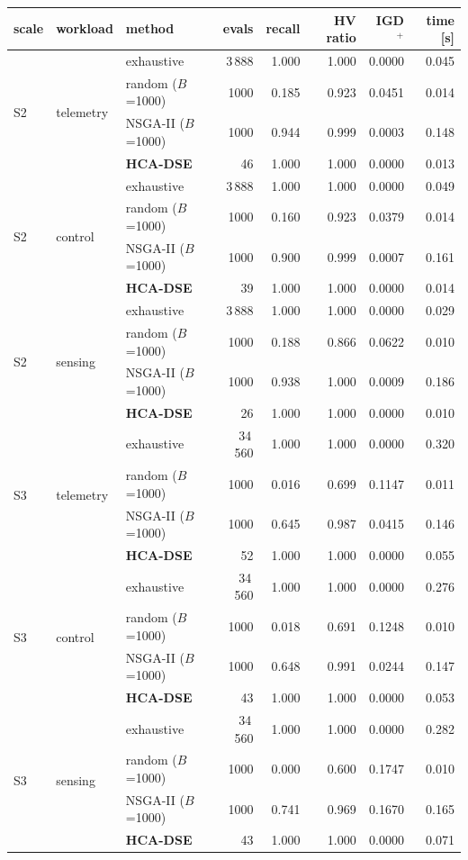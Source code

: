 \scriptsize
\begin{tabular}{lllrrrrr}
\toprule
scale & workload & method & evals & recall & HV ratio & IGD$^{+}$ & time [s] \\
\midrule

\multirow{4}{*}{S2} & \multirow{4}{*}{telemetry} & exhaustive & 3\,888 & 1.000 & 1.000 & 0.0000 & 0.045 \\
 & & random ($B$=1000) & 1000 & 0.185 & 0.923 & 0.0451 & 0.014 \\
 & & NSGA-II ($B$=1000) & 1000 & 0.944 & 0.999 & 0.0003 & 0.148 \\
 & & \textbf{HCA-DSE} & 46 & 1.000 & 1.000 & 0.0000 & 0.013 \\
\midrule
\multirow{4}{*}{S2} & \multirow{4}{*}{control} & exhaustive & 3\,888 & 1.000 & 1.000 & 0.0000 & 0.049 \\
 & & random ($B$=1000) & 1000 & 0.160 & 0.923 & 0.0379 & 0.014 \\
 & & NSGA-II ($B$=1000) & 1000 & 0.900 & 0.999 & 0.0007 & 0.161 \\
 & & \textbf{HCA-DSE} & 39 & 1.000 & 1.000 & 0.0000 & 0.014 \\
\midrule
\multirow{4}{*}{S2} & \multirow{4}{*}{sensing} & exhaustive & 3\,888 & 1.000 & 1.000 & 0.0000 & 0.029 \\
 & & random ($B$=1000) & 1000 & 0.188 & 0.866 & 0.0622 & 0.010 \\
 & & NSGA-II ($B$=1000) & 1000 & 0.938 & 1.000 & 0.0009 & 0.186 \\
 & & \textbf{HCA-DSE} & 26 & 1.000 & 1.000 & 0.0000 & 0.010 \\
\midrule
\multirow{4}{*}{S3} & \multirow{4}{*}{telemetry} & exhaustive & 34\,560 & 1.000 & 1.000 & 0.0000 & 0.320 \\
 & & random ($B$=1000) & 1000 & 0.016 & 0.699 & 0.1147 & 0.011 \\
 & & NSGA-II ($B$=1000) & 1000 & 0.645 & 0.987 & 0.0415 & 0.146 \\
 & & \textbf{HCA-DSE} & 52 & 1.000 & 1.000 & 0.0000 & 0.055 \\
\midrule
\multirow{4}{*}{S3} & \multirow{4}{*}{control} & exhaustive & 34\,560 & 1.000 & 1.000 & 0.0000 & 0.276 \\
 & & random ($B$=1000) & 1000 & 0.018 & 0.691 & 0.1248 & 0.010 \\
 & & NSGA-II ($B$=1000) & 1000 & 0.648 & 0.991 & 0.0244 & 0.147 \\
 & & \textbf{HCA-DSE} & 43 & 1.000 & 1.000 & 0.0000 & 0.053 \\
\midrule
\multirow{4}{*}{S3} & \multirow{4}{*}{sensing} & exhaustive & 34\,560 & 1.000 & 1.000 & 0.0000 & 0.282 \\
 & & random ($B$=1000) & 1000 & 0.000 & 0.600 & 0.1747 & 0.010 \\
 & & NSGA-II ($B$=1000) & 1000 & 0.741 & 0.969 & 0.1670 & 0.165 \\
 & & \textbf{HCA-DSE} & 43 & 1.000 & 1.000 & 0.0000 & 0.071 \\
\bottomrule
\end{tabular}
